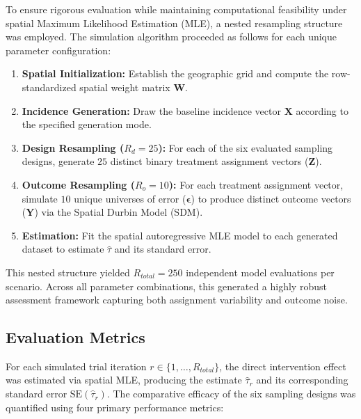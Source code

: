 \documentclass[11pt]{article}
\begin{document}
To ensure rigorous evaluation while maintaining computational feasibility under spatial Maximum Likelihood Estimation (MLE), a nested resampling structure was employed. The simulation algorithm proceeded as follows for each unique parameter configuration:
\begin{enumerate}
    \item \textbf{Spatial Initialization:} Establish the geographic grid and compute the row-standardized spatial weight matrix $\bm{W}$.
    \item \textbf{Incidence Generation:} Draw the baseline incidence vector $\bm{X}$ according to the specified generation mode.
    \item \textbf{Design Resampling ($R_d = 25$):} For each of the six evaluated sampling designs, generate $25$ distinct binary treatment assignment vectors ($\bm{Z}$).
    \item \textbf{Outcome Resampling ($R_o = 10$):} For each treatment assignment vector, simulate $10$ unique universes of error ($\bm{\epsilon}$) to produce distinct outcome vectors ($\bm{Y}$) via the Spatial Durbin Model (SDM).
    \item \textbf{Estimation:} Fit the spatial autoregressive MLE model to each generated dataset to estimate $\hat{\tau}$ and its standard error.
\end{enumerate}
This nested structure yielded $R_{total} = 250$ independent model evaluations per scenario. Across all parameter combinations, this generated a highly robust assessment framework capturing both assignment variability and outcome noise.

\subsection{Evaluation Metrics}

For each simulated trial iteration $r \in \{1, \dots, R_{total}\}$, the direct intervention effect was estimated via spatial MLE, producing the estimate $\hat{\tau}_r$ and its corresponding standard error $\text{SE}(\hat{\tau}_r)$. The comparative efficacy of the six sampling designs was quantified using four primary performance metrics:
\end{document}
